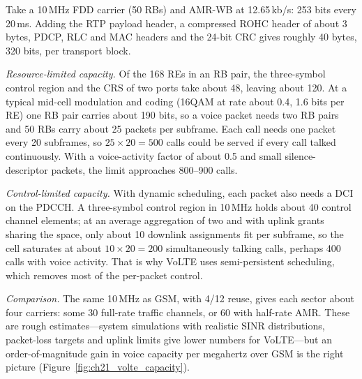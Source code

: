
\begin{worked}
Take a 10\,MHz FDD carrier (50 RBs) and AMR-WB at 12.65\,kb/s: 253 bits every 20\,ms. Adding the RTP
payload header, a compressed ROHC header of about 3 bytes, PDCP, RLC and MAC headers and the 24-bit
CRC gives roughly 40 bytes, 320 bits, per transport block.

\emph{Resource-limited capacity.} Of the 168 REs in an RB pair, the three-symbol control region and
the CRS of two ports take about 48, leaving about 120. At a typical mid-cell modulation and coding
(16QAM at rate about 0.4, 1.6 bits per RE) one RB pair carries about 190 bits, so a voice packet needs
two RB pairs and 50 RBs carry about 25 packets per subframe. Each call needs one packet every 20
subframes, so $25\times20=500$ calls could be served if every call talked continuously. With a
voice-activity factor of about 0.5 and small silence-descriptor packets, the limit approaches
800--900 calls.

\emph{Control-limited capacity.} With dynamic scheduling, each packet also needs a DCI on the PDCCH.
A three-symbol control region in 10\,MHz holds about 40 control channel elements; at an average
aggregation of two and with uplink grants sharing the space, only about 10 downlink assignments fit
per subframe, so the cell saturates at about $10\times20=200$ simultaneously talking calls, perhaps
400 calls with voice activity. That is why VoLTE uses semi-persistent scheduling, which removes most
of the per-packet control.

\emph{Comparison.} The same 10\,MHz as GSM, with 4/12 reuse, gives each sector about four carriers:
some 30 full-rate traffic channels, or 60 with half-rate AMR. These are rough estimates---system
simulations with realistic SINR distributions, packet-loss targets and uplink limits give lower
numbers for VoLTE---but an order-of-magnitude gain in voice capacity per megahertz over GSM is the
right picture (Figure~\ref{fig:ch21_volte_capacity}).
\end{worked}


